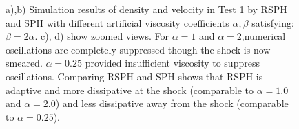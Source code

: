 \documentclass[review]{elsarticle}
\begin{document}
\begin{figure}[htp]
\begin{minipage}{.495 \textwidth}
    \end{minipage}%
    \caption{a),b) Simulation results of density and velocity in Test 1 by RSPH and SPH with different artificial viscosity coefficients $\alpha,\beta$ satisfying: $\beta=2\alpha$.  c), d) show zoomed views.  For $\alpha=1$ and $\alpha=2$,numerical oscillations are completely suppressed though the shock is now smeared. $\alpha=0.25$ provided insufficient viscosity to suppress oscillations. Comparing  RSPH and SPH shows that RSPH is adaptive and more dissipative at the shock 
    (comparable to $\alpha=1.0$ and $\alpha=2.0$) and less dissipative away from the shock (comparable to $\alpha=0.25$). %
%    
    }
    \label{fig:RCM-Sod-SPH-alf}
\end{figure}
\end{document}
